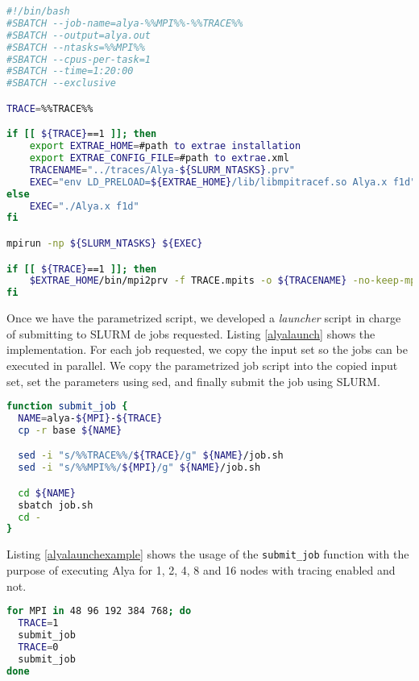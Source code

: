 \begin{lstlisting}[language=sh, caption={Parametrized alya script.}, label={alyageneral}]
#!/bin/bash
#SBATCH --job-name=alya-%%MPI%%-%%TRACE%%
#SBATCH --output=alya.out
#SBATCH --ntasks=%%MPI%%
#SBATCH --cpus-per-task=1
#SBATCH --time=1:20:00
#SBATCH --exclusive

TRACE=%%TRACE%%

if [[ ${TRACE}==1 ]]; then 
    export EXTRAE_HOME=#path to extrae installation
    export EXTRAE_CONFIG_FILE=#path to extrae.xml
    TRACENAME="../traces/Alya-${SLURM_NTASKS}.prv"
    EXEC="env LD_PRELOAD=${EXTRAE_HOME}/lib/libmpitracef.so Alya.x f1d"
else
    EXEC="./Alya.x f1d"
fi

mpirun -np ${SLURM_NTASKS} ${EXEC}

if [[ ${TRACE}==1 ]]; then
    $EXTRAE_HOME/bin/mpi2prv -f TRACE.mpits -o ${TRACENAME} -no-keep-mpits
fi
\end{lstlisting}

Once we have the parametrized script, we developed a \textit{launcher} script in charge of submitting to SLURM de jobs requested. Listing \ref{alyalaunch} shows the implementation. For each job requested, we copy the input set so the jobs can be executed in parallel. We copy the parametrized job script into the copied input set, set the parameters using sed, and finally submit the job using SLURM.

\begin{lstlisting}[language=sh, caption={Alya launcher script.}, label={alyalaunch}]
function submit_job {
  NAME=alya-${MPI}-${TRACE} 
  cp -r base ${NAME}

  sed -i "s/%%TRACE%%/${TRACE}/g" ${NAME}/job.sh
  sed -i "s/%%MPI%%/${MPI}/g" ${NAME}/job.sh

  cd ${NAME}
  sbatch job.sh
  cd -
}

\end{lstlisting}

Listing \ref{alyalaunchexample} shows the usage of the \texttt{submit\_job} function with the purpose of executing Alya for 1, 2, 4, 8 and 16 nodes with tracing enabled and not.

\begin{lstlisting}[language=sh, caption={Alya job launch example.}, label={alyalaunchexample}]
for MPI in 48 96 192 384 768; do
  TRACE=1
  submit_job
  TRACE=0
  submit_job
done
\end{lstlisting}
